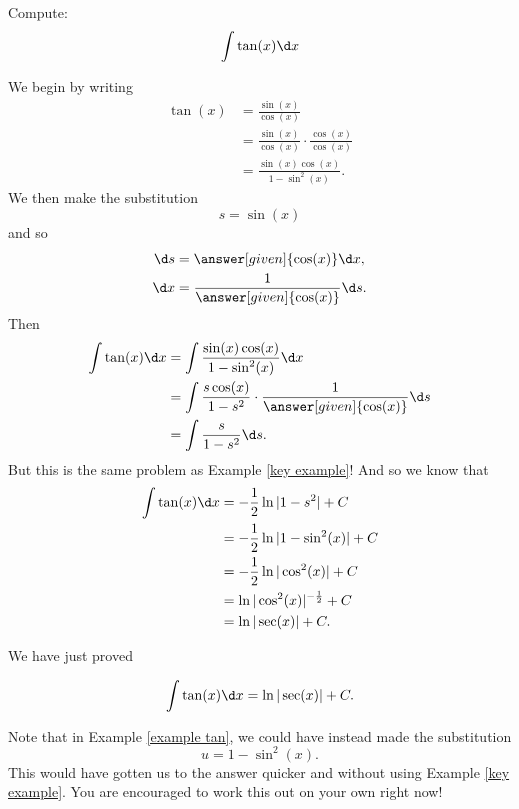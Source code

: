 \documentclass{ximera}
\begin{document}

\begin{example}\label{example tan}
Compute:
\[
\int \tan(x) \d x
\]
\begin{explanation}
We begin by writing
\begin{align*}
\tan(x) &= \frac{\sin(x)}{\cos(x)}  \\
&= \frac{\sin(x)}{\cos(x)} \cdot \frac{\cos(x)}{\cos(x)}  \\
&= \frac{\sin(x) \cos(x)}{1 - \sin^2(x)}.
\end{align*}
We then make the substitution
\[
s = \sin(x)
\]
and so
\begin{align*}
\d s &= \answer[given]{\cos(x)} \d x,\\
\d x &= \frac{1}{\answer[given]{\cos(x)}} \d s.
\end{align*}
Then
\begin{align*}
\int \tan(x) \d x &= \int \frac{\sin(x) \cos(x)}{1 - \sin^2(x)} \d x  \\
&= \int \frac{s \cos(x)}{1 - s^2} \cdot \frac{1}{\answer[given]{\cos(x)}} \d s  \\
&= \int \frac{s}{1-s^2} \d s.
\end{align*}
But this is the same problem as Example \ref{key example}!  
And so we know that
\begin{align*}
\int \tan(x) \d x &= - \frac{1}{2} \ln|1-s^2| + C  \\
&= - \frac{1}{2} \ln|1-\sin^2 (x)| + C  \\
&= - \frac{1}{2} \ln|\cos^2(x)| + C  \\
&= \ln|\cos^2(x)|^{- \frac{1}{2}} + C  \\
&= \ln|\sec(x)| + C.
\end{align*}
\end{explanation}
\end{example}

We have just proved

\begin{theorem}
\[
\int \tan(x) \d x = \ln|\sec(x)| + C.
\]
\end{theorem}

Note that in Example \ref{example tan}, we could have instead made the substitution
\[
u = 1-\sin^2(x).
\]
This would have gotten us to the answer quicker and without using Example \ref{key example}.  
You are encouraged to work this out on your own right now!
\end{document}
